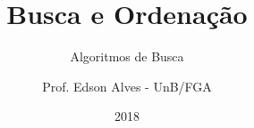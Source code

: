 \title{Busca e Ordenação}
\subtitle{Algoritmos de Busca}
\author{Prof. Edson Alves - UnB/FGA}
\date{2018}
